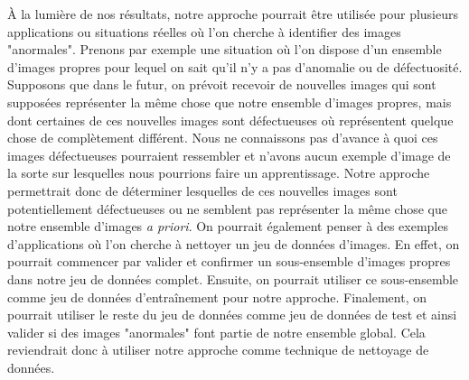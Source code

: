 À la lumière de nos résultats, notre approche pourrait être utilisée pour plusieurs applications ou situations réelles où l'on cherche à identifier des images "anormales". Prenons par exemple une situation où l'on dispose d'un ensemble d'images propres pour lequel on sait qu'il n'y a pas d'anomalie ou de défectuosité. Supposons que dans le futur, on prévoit recevoir de nouvelles images qui sont supposées représenter la même chose que notre ensemble d'images propres, mais dont certaines de ces nouvelles images sont défectueuses où représentent quelque chose de complètement différent. Nous ne connaissons pas d'avance à quoi ces images défectueuses pourraient ressembler et n'avons aucun exemple d'image de la sorte sur lesquelles nous pourrions faire un apprentissage. Notre approche permettrait donc de déterminer lesquelles de ces nouvelles images sont potentiellement défectueuses ou ne semblent pas représenter la même chose que notre ensemble d'images \textit{a priori}. On pourrait également penser à des exemples d'applications où l'on cherche à nettoyer un jeu de données d'images. En effet, on pourrait commencer par valider et confirmer un sous-ensemble d'images propres dans notre jeu de données complet. Ensuite, on pourrait utiliser ce sous-ensemble comme jeu de données d'entraînement pour notre approche. Finalement, on pourrait utiliser le reste du jeu de données comme jeu de données de test et ainsi valider si des images "anormales" font partie de notre ensemble global. Cela reviendrait donc à utiliser notre approche comme technique de nettoyage de données\DIFaddbegin {}\DIFaddend .

